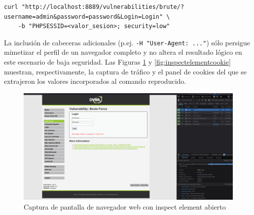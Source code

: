 \documentclass[letterpaper,12pt]{article}
\begin{document}
\begin{verbatim}
curl "http://localhost:8889/vulnerabilities/brute/?username=admin&password=password&Login=Login" \
    -b "PHPSESSID=<valor_sesion>; security=low"
\end{verbatim}
La inclusión de cabeceras adicionales (p.ej. \texttt{-H "User-Agent: ..."}) sólo persigue mimetizar el perfil de un navegador completo y no altera el resultado lógico en este escenario de baja seguridad. Las Figuras \ref{fig:inspectelement} y \ref{fig:inspectelementcookie} muestran, respectivamente, la captura de tráfico y el panel de cookies del que se extrajeron los valores incorporados al comando reproducido.
\begin{figure}
    \centering
    \includegraphics[width=1\linewidth]{curl/Captura desde 2025-10-01 23-42-53.png}
    \caption{Captura de pantalla de navegador web con inspect element abierto}
    \label{fig:inspectelement}
\end{figure}
\end{document}
